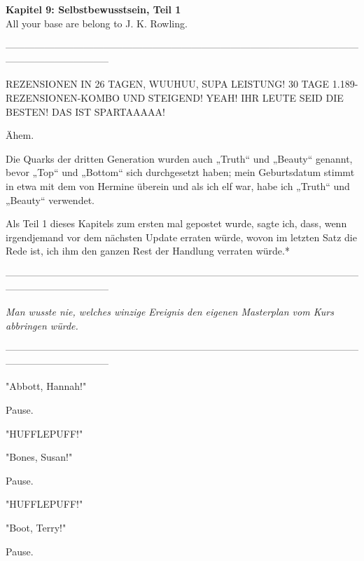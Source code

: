 

\hypertarget{selbstbewusstsein-teil-1}{%

\textbf{Kapitel 9: Selbstbewusstsein, Teil 1}\\

\hfill\break All your base are belong to J. K. Rowling.

--------------------------------------------------------------------------------------------------------------------------------------------

\hfill{} REZENSIONEN IN 26 TAGEN, WUUHUU, SUPA LEISTUNG! 30 TAGE 1.189-REZENSIONEN-KOMBO UND STEIGEND! YEAH! IHR LEUTE SEID DIE BESTEN! DAS IST SPARTAAAAA!

Ähem.

Die Quarks der dritten Generation wurden auch „Truth“ und „Beauty“ genannt, bevor „Top“ und „Bottom“ sich durchgesetzt haben; mein Geburtsdatum stimmt in etwa mit dem von Hermine überein und als ich elf war, habe ich „Truth“ und „Beauty“ verwendet.

Als Teil 1 dieses Kapitels zum ersten mal gepostet wurde, sagte ich, dass, wenn irgendjemand vor dem nächsten Update erraten würde, wovon im letzten Satz die Rede ist, ich ihm den ganzen Rest der Handlung verraten würde.*

--------------------------------------------------------------------------------------------------------------------------------------------

\hfill\break

\emph{Man wusste nie, welches winzige Ereignis den eigenen Masterplan vom Kurs abbringen würde.}

\hfill\break

--------------------------------------------------------------------------------------------------------------------------------------------

"Abbott, Hannah!"

Pause.

"HUFFLEPUFF!"

"Bones, Susan!"

Pause.

"HUFFLEPUFF!"

"Boot, Terry!"

Pause.

}
